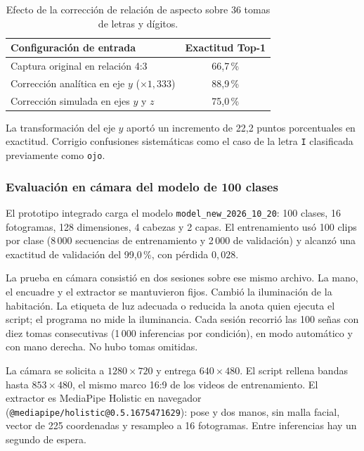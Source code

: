 \begin{table}[H]
    \centering
    \small
    \caption{Efecto de la corrección de relación de aspecto sobre 36 tomas de letras y dígitos.}
    \label{tab:aspect}
    \begin{tabular}{lc}
        \toprule
        \textbf{Configuración de entrada} & \textbf{Exactitud Top-1} \\
        \midrule
        Captura original en relación 4:3 & 66{,}7\,\% \\
        Corrección analítica en eje $y$ ($\times 1{,}333$) & 88{,}9\,\% \\
        Corrección simulada en ejes $y$ y $z$ & 75{,}0\,\% \\
        \bottomrule
    \end{tabular}
\end{table}

La transformación del eje $y$ aportó un incremento de 22,2 puntos porcentuales en exactitud. Corrigio confusiones sistemáticas como el caso de la letra \texttt{I} clasificada previamente como \texttt{ojo}.

\subsubsection{Evaluación en cámara del modelo de 100 clases}
\label{sec:eval_100_camara}

El prototipo integrado carga el modelo \texttt{model\_new\_2026\_10\_20}: 100 clases, 16 fotogramas, 128 dimensiones, 4 cabezas y 2 capas. El entrenamiento usó 100 clips por clase (8\,000 secuencias de entrenamiento y 2\,000 de validación) y alcanzó una exactitud de validación del 99{,}0\,\%, con pérdida $0{,}028$.

La prueba en cámara consistió en dos sesiones sobre ese mismo archivo. La mano, el encuadre y el extractor se mantuvieron fijos. Cambió la iluminación de la habitación. La etiqueta de luz adecuada o reducida la anota quien ejecuta el script; el programa no mide la iluminancia. Cada sesión recorrió las 100 señas con diez tomas consecutivas (1\,000 inferencias por condición), en modo automático y con mano derecha. No hubo tomas omitidas.

La cámara se solicita a $1280\times 720$ y entrega $640\times 480$. El script rellena bandas hasta $853\times 480$, el mismo marco 16:9 de los videos de entrenamiento. El extractor es MediaPipe Holistic en navegador (\texttt{@mediapipe/holistic@0.5.1675471629}): pose y dos manos, sin malla facial, vector de 225 coordenadas y resampleo a 16 fotogramas. Entre inferencias hay un segundo de espera.

